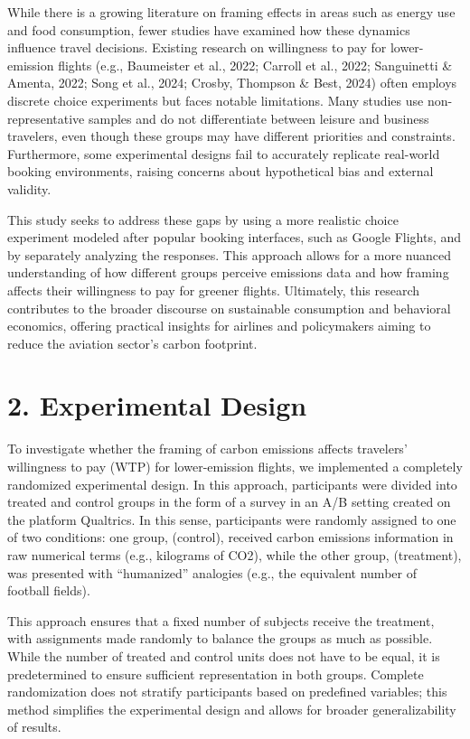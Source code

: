 \documentclass[
]{article}
\begin{document}
While there is a growing literature on framing effects in areas such as
energy use and food consumption, fewer studies have examined how these
dynamics influence travel decisions. Existing research on willingness to
pay for lower-emission flights (e.g., Baumeister et al., 2022; Carroll
et al., 2022; Sanguinetti \& Amenta, 2022; Song et al., 2024; Crosby,
Thompson \& Best, 2024) often employs discrete choice experiments but
faces notable limitations. Many studies use non-representative samples
and do not differentiate between leisure and business travelers, even
though these groups may have different priorities and constraints.
Furthermore, some experimental designs fail to accurately replicate
real-world booking environments, raising concerns about hypothetical
bias and external validity.

This study seeks to address these gaps by using a more realistic choice
experiment modeled after popular booking interfaces, such as Google
Flights, and by separately analyzing the responses. This approach allows
for a more nuanced understanding of how different groups perceive
emissions data and how framing affects their willingness to pay for
greener flights. Ultimately, this research contributes to the broader
discourse on sustainable consumption and behavioral economics, offering
practical insights for airlines and policymakers aiming to reduce the
aviation sector's carbon footprint.

\hypertarget{experimental-design}{%
\section{2. Experimental Design}\label{experimental-design}}

To investigate whether the framing of carbon emissions affects
travelers' willingness to pay (WTP) for lower-emission flights, we
implemented a completely randomized experimental design. In this
approach, participants were divided into treated and control groups in
the form of a survey in an A/B setting created on the platform
Qualtrics. In this sense, participants were randomly assigned to one of
two conditions: one group, (control), received carbon emissions
information in raw numerical terms (e.g., kilograms of CO2), while the
other group, (treatment), was presented with ``humanized'' analogies
(e.g., the equivalent number of football fields).

This approach ensures that a fixed number of subjects receive the
treatment, with assignments made randomly to balance the groups as much
as possible. While the number of treated and control units does not have
to be equal, it is predetermined to ensure sufficient representation in
both groups. Complete randomization does not stratify participants based
on predefined variables; this method simplifies the experimental design
and allows for broader generalizability of results.
\end{document}
